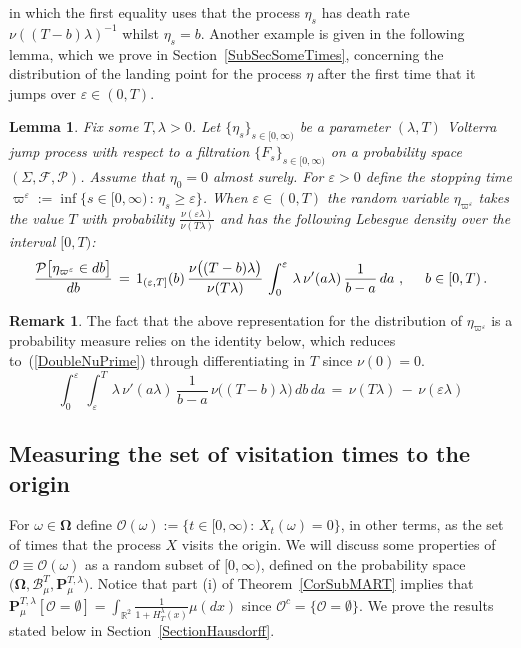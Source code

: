 \documentclass[10pt]{article}
\numberwithin{equation}{section}
\newtheorem{lemma}[theorem]{Lemma}
\theoremstyle{definition}
\newtheorem{remark}[theorem]{Remark}
\newcommand{\R}{{\mathbb R}}
\begin{document}
in which the first equality uses that the process $\eta_s$ has death rate $ \nu((T-b)\lambda )^{-1}    $ whilst $\eta_s=b$.  Another example is given in the following lemma, which we prove in  Section~\ref{SubSecSomeTimes}, concerning the distribution of the landing point for  the process  $\eta$ after the first time that it jumps over  $\varepsilon\in (0,T)$.
\begin{lemma}\label{LemmaEscape}Fix some $T,\lambda>0$. Let  $\{ \eta_s \}_{s\in [0,\infty)}$ be a parameter $(\lambda,T)$ Volterra jump process with respect to a filtration  $\{  F_s\}_{s\in [0,\infty)}$ on a probability space  $(\Sigma, \mathcal{F},\mathcal{P})$.  Assume that $ \eta_0=0$ almost surely.  For $\varepsilon>0$  define the stopping time $ \varpi^{\varepsilon}:=\inf\{s\in [0,\infty) \,:\,  \eta_s  \geq  \varepsilon  \}$. When $\varepsilon\in (0,T)$ the  random variable $\eta_{ \varpi^{\varepsilon} }$ takes the value $T$ with probability  $\frac{ \nu(\varepsilon  \lambda )}{ \nu(T\lambda )} $ and has the following Lebesgue density over the interval $[0,T)$:
\begin{align*}
\frac{\mathcal{P}\big[\eta_{ \varpi^{\varepsilon} } \in db\big]}{db}\,=\,  1_{ (\varepsilon,T]}(b) \,\frac{ \nu\big((T-b) \lambda\big)}{ \nu(T\lambda )}\, \int_{0}^{\varepsilon}\,\lambda \,\nu'(a\lambda )\,\frac{1}{b-a}\,da\,\,, \hspace{.5cm}b\in [0,T)\,.
\end{align*}
\end{lemma}

\begin{remark}\label{RemarkVartheta}  The fact that the above representation for the distribution of $\eta_{ \varpi^{\varepsilon} }$ is a  probability measure relies on the identity below, which reduces to~(\ref{DoubleNuPrime}) through differentiating in $T$ since $\nu(0)=0$.
$$  \int_{0}^{\varepsilon} \,\int_{\varepsilon}^{T}\,\lambda \,\nu'(a \lambda )\,\frac{1}{b-a}\,\nu\big( (T-b)\lambda \big)\,db\,da\,=\,\nu(T\lambda )\,-\,\nu(\varepsilon\lambda )  $$
\end{remark}






\subsection{Measuring the set of visitation times to the origin}\label{SubsectionOriginSet}


 For $\omega \in \boldsymbol{\Omega}$ define  $\mathscr{O}(\omega):=\{t\in [0,\infty)\,:\, X_t(\omega)=0\} $, in other terms, as the set of times that the process $X$ visits the origin. We will discuss some properties of $\mathscr{O}\equiv\mathscr{O}(\omega)$ as a random subset of $[0,\infty)$, defined on the probability space $\big( \boldsymbol{\Omega},\mathscr{B}_{\mu}^T,  \mathbf{P}_{\mu}^{T,\lambda} \big)$. Notice that part (i) of Theorem~\ref{CorSubMART} implies that $\mathbf{P}_{\mu}^{T,\lambda}[\mathscr{O}=\emptyset  ]=\int_{\R^2}\frac{1}{1+H_T^{\lambda}(x)  } \mu(dx)  $  since $\mathcal{O}^c=\{\mathscr{O}=\emptyset\}$.  We prove the results stated below in Section~\ref{SectionHausdorff}.
\end{document}

